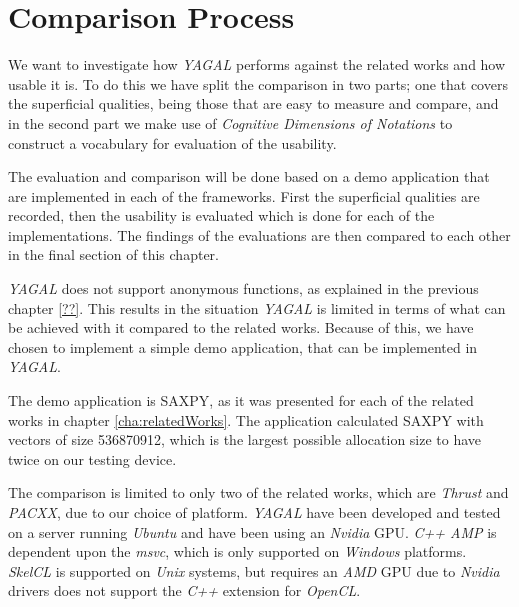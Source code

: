 \section{Comparison Process}
We want to investigate how \textit{YAGAL} performs against the related works and how usable it is. To do this we have split the comparison in two parts; one that covers the superficial qualities, being those that are easy to measure and compare, and in the second part we make use of \textit{Cognitive Dimensions of Notations} to construct a vocabulary for evaluation of the usability.

The evaluation and comparison will be done based on a demo application that are implemented in each of the frameworks. First the superficial qualities are recorded, then the usability is evaluated which is done for each of the implementations. The findings of the evaluations are then compared to each other in the final section of this chapter.

\textit{YAGAL} does not support anonymous functions, as explained in the previous chapter \ref{??}. This results in the situation \textit{YAGAL} is limited in terms of what can be achieved with it compared to the related works. Because of this, we have chosen to implement a simple demo application, that can be implemented in \textit{YAGAL}. 

The demo application is SAXPY, as it was presented for each of the related works in chapter \ref{cha:relatedWorks}. The application calculated SAXPY with vectors of size 536870912, which is the largest possible allocation size to have twice on our testing device.

The comparison is limited to only two of the related works, which are \textit{Thrust} and \textit{PACXX}, due to our choice of platform. \textit{YAGAL} have been developed and tested on a server running \textit{Ubuntu} and have been using an \textit{Nvidia} GPU. \textit{C++ AMP} is dependent upon the \textit{msvc}, which is only supported on \textit{Windows} platforms. \textit{SkelCL} is supported on \textit{Unix} systems, but requires an \textit{AMD} GPU due to \textit{Nvidia} drivers does not support the \textit{C++} extension for \textit{OpenCL}.

